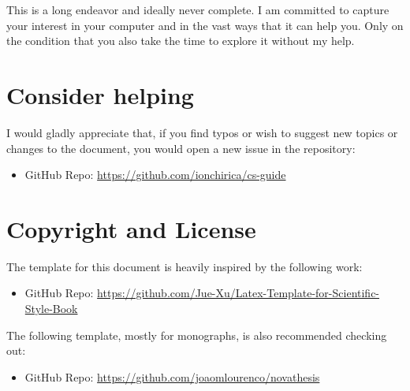This is a long endeavor and ideally never complete. I am committed to
capture your interest in your computer and in the vast ways that it
can help you. Only on the condition that you also take the time to
explore it without my help.

\section{Consider helping}

I would gladly appreciate that, if you find typos or wish to suggest new topics or changes to the
document, you would open a new issue in the repository:
\begin{itemize}
    \item GitHub Repo: \url{https://github.com/ionchirica/cs-guide}
\end{itemize}

\section{Copyright and License}
The template for this document is heavily inspired by the following work:
\begin{itemize}
    \item GitHub Repo: \url{https://github.com/Jue-Xu/Latex-Template-for-Scientific-Style-Book}
\end{itemize}
The following template, mostly for monographs, is also recommended
checking out:
\begin{itemize}
    \item GitHub Repo: \url{https://github.com/joaomlourenco/novathesis}
\end{itemize}
